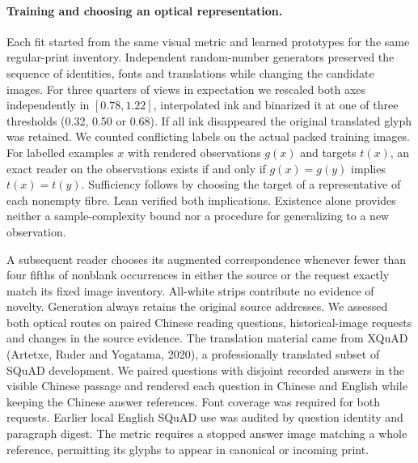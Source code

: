 \paragraph{Training and choosing an optical representation.}
Each fit started from the same visual metric and learned prototypes for the same regular-print inventory. Independent random-number generators preserved the sequence of identities, fonts and translations while changing the candidate images. For three quarters of views in expectation we rescaled both axes independently in $[0.78,1.22]$, interpolated ink and binarized it at one of three thresholds (0.32, 0.50 or 0.68). If all ink disappeared the original translated glyph was retained. We counted conflicting labels on the actual packed training images. For labelled examples $x$ with rendered observations $g(x)$ and targets $t(x)$, an exact reader on the observations exists if and only if $g(x)=g(y)$ implies $t(x)=t(y)$. Sufficiency follows by choosing the target of a representative of each nonempty fibre. Lean verified both implications. Existence alone provides neither a sample-complexity bound nor a procedure for generalizing to a new observation.

A subsequent reader chooses its augmented correspondence whenever fewer than four fifths of nonblank occurrences in either the source or the request exactly match its fixed image inventory. All-white strips contribute no evidence of novelty. Generation always retains the original source addresses. We assessed both optical routes on paired Chinese reading questions, historical-image requests and changes in the source evidence. The translation material came from XQuAD (Artetxe, Ruder and Yogatama, 2020), a professionally translated subset of SQuAD development. We paired questions with disjoint recorded answers in the visible Chinese passage and rendered each question in Chinese and English while keeping the Chinese answer references. Font coverage was required for both requests. Earlier local English SQuAD use was audited by question identity and paragraph digest. The metric requires a stopped answer image matching a whole reference, permitting its glyphs to appear in canonical or incoming print.
